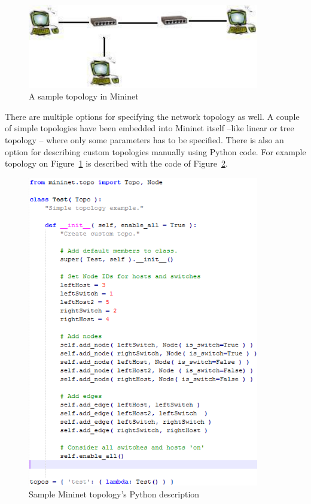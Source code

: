 \documentclass[a4paper]{article}
\begin{document}
\begin{figure}[H]%
    \centering
    \includegraphics[width=0.9\textwidth]{figures/mininet-topology.png}
    \caption{A sample topology in Mininet}
    \label{fig:Mininet-sample-topo}
\end{figure}

There are multiple options for specifying the network topology as well. A couple of simple topologies have been
embedded into Mininet itself --like linear or tree topology -- where only some parameters has to be specified.
There is also an option for describing custom topologies manually using Python code. For example topology on
Figure~\ref{fig:Mininet-sample-topo} is described with the code of Figure~\ref{fig:Mininet-sample-topo-code}.

\begin{figure}[H]%
    \centering
    \includegraphics[width=0.9\textwidth]{figures/mininet-code.png}
    \caption{Sample Mininet topology's Python description}
    \label{fig:Mininet-sample-topo-code}
\end{figure}
\end{document}
